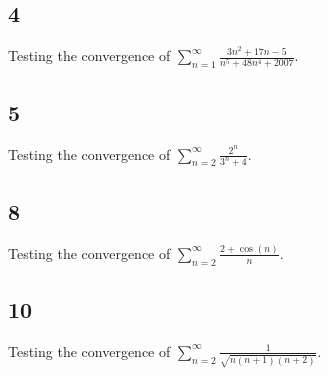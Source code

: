 \documentclass[12pt]{article}
\begin{document}
\subsection*{4}
Testing the convergence of $\sum_{n=1}^\infty \frac{3n^2 + 17n - 5}{n^5 + 48n^4 + 2007}$.

\subsection*{5}
Testing the convergence of $\sum_{n=2}^\infty \frac{2^n}{3^n + 4}$.

\subsection*{8}
Testing the convergence of $\sum_{n=2}^\infty \frac{2 + \cos(n)}{n}$.

\subsection*{10}
Testing the convergence of $\sum_{n=2}^\infty \frac{1}{\sqrt{n(n+1)(n+2)}}$.
\end{document}
